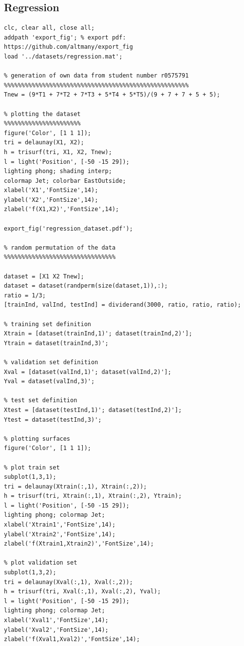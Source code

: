 \documentclass[11pt, a4paper]{article}
\begin{document}
\begin{appendices}
\section{Regression}
\begin{lstlisting}
clc, clear all, close all;
addpath 'export_fig'; % export pdf: https://github.com/altmany/export_fig
load '../datasets/regression.mat';

% generation of own data from student number r0575791
%%%%%%%%%%%%%%%%%%%%%%%%%%%%%%%%%%%%%%%%%%%%%%%%%%%%%
Tnew = (9*T1 + 7*T2 + 7*T3 + 5*T4 + 5*T5)/(9 + 7 + 7 + 5 + 5);

% plotting the dataset
%%%%%%%%%%%%%%%%%%%%%%
figure('Color', [1 1 1]);
tri = delaunay(X1, X2);
h = trisurf(tri, X1, X2, Tnew);
l = light('Position', [-50 -15 29]);
lighting phong; shading interp; 
colormap Jet; colorbar EastOutside;
xlabel('X1','FontSize',14); 
ylabel('X2','FontSize',14);
zlabel('f(X1,X2)','FontSize',14);

export_fig('regression_dataset.pdf');

% random permutation of the data
%%%%%%%%%%%%%%%%%%%%%%%%%%%%%%%%

dataset = [X1 X2 Tnew];
dataset = dataset(randperm(size(dataset,1)),:);
ratio = 1/3;
[trainInd, valInd, testInd] = dividerand(3000, ratio, ratio, ratio);

% training set definition
Xtrain = [dataset(trainInd,1)'; dataset(trainInd,2)'];
Ytrain = dataset(trainInd,3)';

% validation set definition
Xval = [dataset(valInd,1)'; dataset(valInd,2)'];
Yval = dataset(valInd,3)';

% test set definition
Xtest = [dataset(testInd,1)'; dataset(testInd,2)'];
Ytest = dataset(testInd,3)';

% plotting surfaces
figure('Color', [1 1 1]);

% plot train set
subplot(1,3,1);
tri = delaunay(Xtrain(:,1), Xtrain(:,2));
h = trisurf(tri, Xtrain(:,1), Xtrain(:,2), Ytrain);
l = light('Position', [-50 -15 29]);
lighting phong; colormap Jet;
xlabel('Xtrain1','FontSize',14); 
ylabel('Xtrain2','FontSize',14);
zlabel('f(Xtrain1,Xtrain2)','FontSize',14);

% plot validation set
subplot(1,3,2);
tri = delaunay(Xval(:,1), Xval(:,2));
h = trisurf(tri, Xval(:,1), Xval(:,2), Yval);
l = light('Position', [-50 -15 29]);
lighting phong; colormap Jet;
xlabel('Xval1','FontSize',14); 
ylabel('Xval2','FontSize',14);
zlabel('f(Xval1,Xval2)','FontSize',14);


\end{lstlisting}
\end{appendices}
\end{document}

